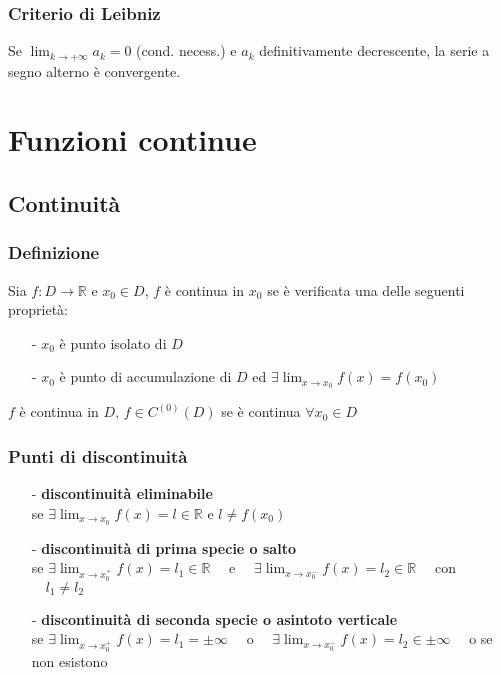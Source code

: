 \documentclass[a4paper]{article}
\newcommand\cont[2]{C^{(#1)} \left({#2}\right)}
\begin{document}
\subsubsection*{Criterio di Leibniz}
Se \(\displaystyle \lim_{k \to +\infty} a_k = 0\) (cond. necess.) e \(a_k\) definitivamente decrescente, la serie a segno alterno è convergente.

\newpage


\section{Funzioni continue}
\subsection{Continuità}
\subsubsection*{Definizione}
Sia \(f:D \to \mathbb{R}\) e \(x_0 \in D\), \(f\) è continua in \(x_0\) se è verificata una delle seguenti proprietà:
\begin{itemize}
	\item[-] \(x_0\) è punto isolato di \(D\)
	\item[-] \(x_0\) è punto di accumulazione di \(D\) ed \(\displaystyle \exists \lim_{x \to x_0} f(x) = f(x_0)\)
\end{itemize}
\(f\) è continua in \(D\), \(f \in \cont{0}{D}\) se è continua \(\forall x_0 \in D\)

\subsubsection*{Punti di discontinuità}
\begin{itemize}
	\item[-] \textbf{discontinuità eliminabile} \\
	se \(\displaystyle \exists \lim_{x \to x_0} f(x) = l \in \mathbb{R}\) e \(l \neq f(x_0)\)
	\item[-] \textbf{discontinuità di prima specie o salto} \\
	se \(\displaystyle \exists \lim_{x \to x_0^+} f(x) = l_1 \in \mathbb{R} \quad\) e \(\displaystyle \quad \exists \lim_{x \to x_0^-} f(x) = l_2 \in \mathbb{R} \quad\) con \(\quad l_1 \neq l_2\)
	\item[-] \textbf{discontinuità di seconda specie o asintoto verticale} \\
	se \(\displaystyle \exists \lim_{x \to x_0^+} f(x) = l_1 = \pm \infty \quad\) o \(\displaystyle \quad \exists \lim_{x \to x_0^-} f(x) = l_2 \in \pm \infty \quad\) o se non esistono
	
\end{itemize}
\end{document}
